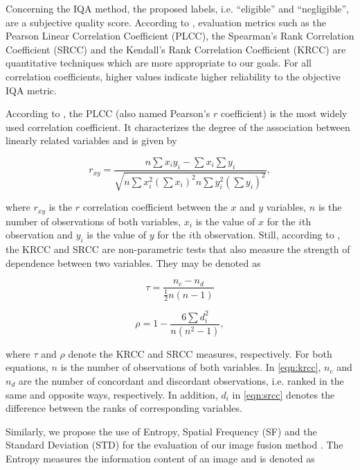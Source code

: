 Concerning the IQA method, the proposed labels, i.e. ``eligible'' and ``negligible'', are a subjective quality score. According to , evaluation metrics such as the Pearson Linear Correlation Coefficient (PLCC), the Spearman's Rank Correlation Coefficient (SRCC) and the Kendall's Rank Correlation Coefficient (KRCC) are quantitative techniques which are more appropriate to our goals. For all correlation coefficients, higher values indicate higher reliability to the objective IQA metric.

According to , the PLCC (also named Pearson's $r$ coefficient) is the most widely used correlation coefficient. It characterizes the degree of the association between linearly related variables and is given by

\begin{equation}
\label{eqn:plcc}
r_{xy} = \frac{n \sum x_{i} y_{i} - \sum x_{i} \sum y_{i}}{\sqrt{n \sum x_{i}^{2} \left(\sum x_{i}\right)^{2} n \sum y_{i}^{2} \left(\sum y_{i}\right)^{2}}},
\end{equation}

\noindent where $r_{xy}$ is the $r$ correlation coefficient between the $x$ and $y$ variables, $n$ is the number of observations of both variables, $x_{i}$ is the value of $x$ for the $i$th observation and $y_{i}$ is the value of $y$ for the $i$th observation. Still, according to , the KRCC and SRCC are non-parametric tests that also measure the strength of dependence between two variables. They may be denoted as

\begin{equation}
\label{eqn:krcc}
\tau = \frac{n_{c} - n_{d}}{\frac{1}{2} n \left(n-1 \right)}
\end{equation}

\begin{equation}
\label{eqn:srcc}
\rho = 1 - \frac{6 \sum d_{i}^{2}}{n \left(n^{2}-1 \right)},
\end{equation}

\noindent where $\tau$ and $\rho$ denote the KRCC and SRCC measures, respectively. For both equations, $n$ is the number of observations of both variables. In \autoref{eqn:krcc}, $n_{c}$ and $n_{d}$ are the number of concordant and discordant observations, i.e. ranked in the same and opposite ways, respectively. In addition, $d_{i}$ in \autoref{eqn:srcc} denotes the difference between the ranks of corresponding variables.

Similarly, we propose the use of Entropy, Spatial Frequency (SF) and the Standard Deviation (STD) for the evaluation of our image fusion method \cite{naidu2008pixel}. The Entropy measures the information content of an image and is denoted as

